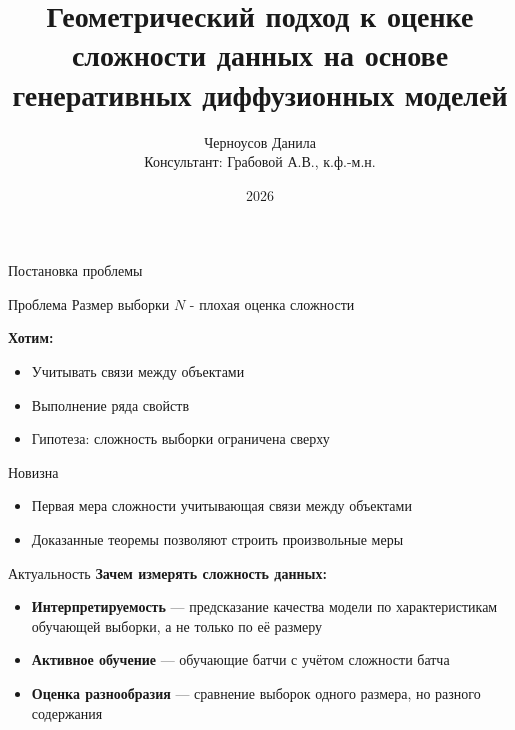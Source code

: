 \documentclass[aspectratio=169]{beamer}
\title{Геометрический подход к оценке сложности данных на основе генеративных диффузионных моделей}
\author{
    Черноусов Данила\\
    Консультант: Грабовой А.В., к.ф.-м.н.
}
\institute{
    Кафедра интеллектуальных систем, МФТИ
}
\date{2026}
\begin{document}
\begin{frame}
    \thispagestyle{empty}
    \maketitle
\end{frame}

\begin{frame}{Постановка проблемы}
    \begin{block}{Проблема}
        Размер выборки $N$ - плохая оценка сложности
    \end{block}

    \medskip
    \textbf{Хотим:}
    \begin{itemize}
        \item Учитывать связи между объектами
        \item Выполнение ряда свойств
        \item Гипотеза: сложность выборки ограничена сверху
    \end{itemize}

    \medskip
    \begin{block}{Новизна}
        \begin{itemize}
            \item Первая мера сложности учитывающая связи между объектами
            \item Доказанные теоремы позволяют строить произвольные меры
    \end{itemize}
    \end{block}
\end{frame}

\begin{frame}{Актуальность}
    \textbf{Зачем измерять сложность данных:}
    \begin{itemize}
        \item \textbf{Интерпретируемость} --- предсказание качества модели
              по характеристикам обучающей выборки, а не только по её размеру
        \item \textbf{Активное обучение} --- обучающие батчи с учётом сложности батча
        \item \textbf{Оценка разнообразия} --- сравнение выборок одного размера,
              но разного содержания

    \end{itemize}

\end{frame}
\end{document}

